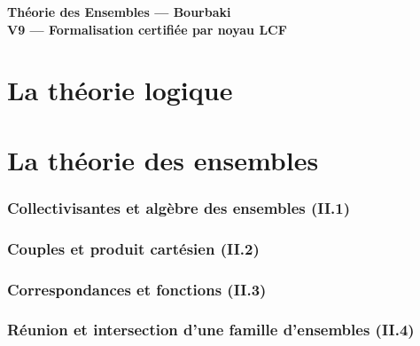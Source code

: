 \documentclass[11pt,a4paper]{article}
\theoremstyle{definition}
\begin{document}
\begin{center}
  \large\bfseries
  Théorie des Ensembles --- Bourbaki \\[0.3em]
  \normalsize V9 --- Formalisation certifiée par noyau LCF
\end{center}

\bigskip
\tableofcontents
\clearpage



\clearpage


\part{La théorie logique}


\part{La théorie des ensembles}

\section{Collectivisantes et algèbre des ensembles (II.1)}


\section{Couples et produit cartésien (II.2)}


\section{Correspondances et fonctions (II.3)}



\section{Réunion et intersection d'une famille d'ensembles (II.4)}

\end{document}
